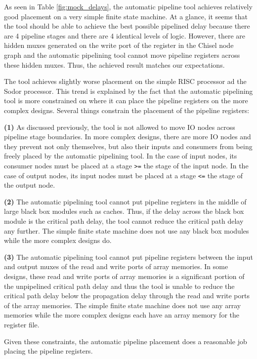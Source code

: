 As seen in Table \ref{fig:mock_delays}, the automatic pipeline tool achieves relatively good  placement on a very simple finite state machine. At a glance, it seems that the tool should be able to achieve the best possible pipelined delay because there are 4 pipeline stages and there are 4 identical levels of logic. However, there are hidden muxes generated on the write port of the register in the Chisel node graph and the automatic pipelining tool cannot move pipeline registers across these hidden muxes. Thus, the achieved result matches our expectations.

The tool achieves slightly worse placement on the simple RISC processor ad the Sodor processor. This trend is explained by the fact that the automatic pipelining tool is more constrained on where it can place the pipeline registers on the more complex designs. Several things constrain the placement of the pipeline registers:

{\bf (1)} 
As discussed previously, the tool is not allowed to move IO nodes across pipeline stage boundaries. In more complex designs, there are more IO nodes and they prevent not only themselves, but also their inputs and consumers from being freely placed by the automatic pipelining tool. In the case of input nodes, its consumer nodes must be placed at a stage {\tt >=} the stage of the input node. In the case of output nodes, its input nodes must be placed at a stage {\tt <=} the stage of the output node.

{\bf (2)}  
The automatic pipelining tool cannot put pipeline registers in the middle of large black box modules such as caches. Thus, if the delay across the black box module is the critical path delay, the tool cannot reduce the critical path delay any further. The simple finite state machine does not use any black box modules while the more complex designs do.

{\bf (3)} 
The automatic pipelining tool cannot put pipeline registers between the input and output muxes of the read and write ports of array memories. In some designs, these read and write ports of array memories is a significant portion of the unpipelined critical path delay and thus the tool is unable to reduce the critical path delay below the propagation delay through the read and write ports of the array memories. The simple finite state machine does not use any array memories while the more complex designs each have an array memory for the register file.

Given these constraints, the automatic pipeline placement does a reasonable job placing the pipeline registers.
